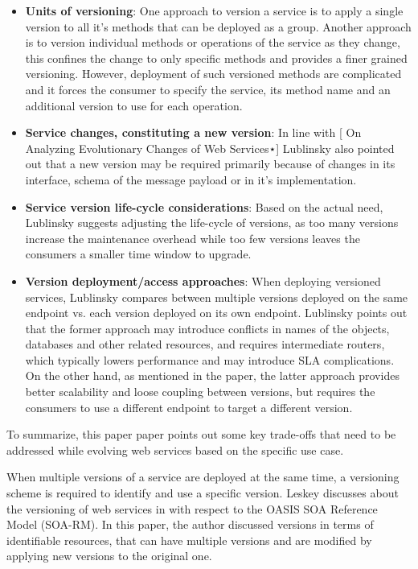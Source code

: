 \documentclass[runningheads,a4paper]{llncs}
\begin{document}
\begin{itemize}

  \item \textbf{Units of versioning}: One approach to version a service is to apply a single version to all it’s methods that can be deployed as a group. Another approach is to version individual methods or operations of the service as they change, this confines the change to only specific methods and provides a finer grained versioning. However, deployment of such versioned methods are complicated and it forces the consumer to specify the service, its method name and an additional version to use for each operation.
  \item \textbf{Service changes, constituting a new version}: In line with [ On Analyzing Evolutionary Changes of Web Services⋆]  Lublinsky also pointed out that a new version may be required primarily because of changes in its interface, schema of the message payload or in it’s implementation.
  \item \textbf{Service version life-cycle considerations}: Based on the actual need, Lublinsky suggests adjusting the life-cycle of versions, as too many versions increase the maintenance overhead while too few versions leaves the consumers a smaller time window to upgrade.
  \item \textbf{Version deployment/access approaches}: When deploying versioned services, Lublinsky compares between multiple versions deployed on the same endpoint vs. each version deployed on its own endpoint. Lublinsky points out that the former approach may introduce conflicts in names of the objects, databases and other related resources, and requires intermediate routers, which typically lowers performance and may introduce SLA complications. On the other hand, as mentioned in the paper, the latter approach provides better scalability and loose coupling between versions, but requires the consumers to use a different endpoint to target a different version.

\end{itemize}

To summarize, this paper paper points out some key trade-offs that need to be addressed while evolving web services based on the specific use case.

When multiple versions of a service are deployed at the same time, a versioning scheme is required to identify and use a specific version. Leskey discusses about the versioning of web services in \cite{laskey2008considerations} with respect to the OASIS SOA Reference Model (SOA-RM). In this paper, the author discussed versions in terms of identifiable resources, that can have multiple versions and are modified by applying new versions to the original one.
\end{document}
